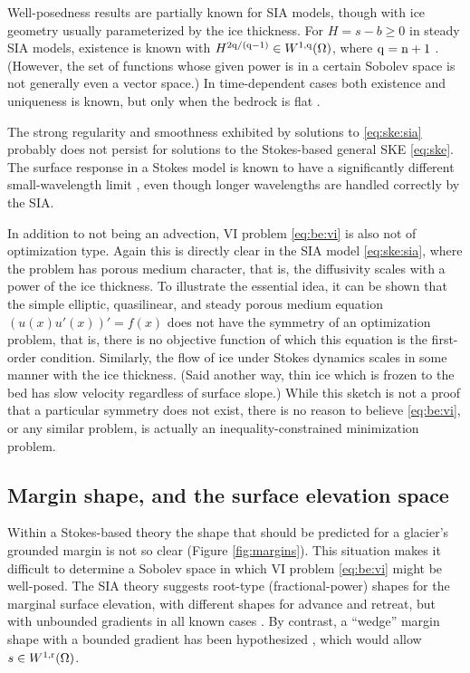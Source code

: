 \documentclass[hidelinks,onefignum,onetabnum,final]{siamart220329}  %
\newcommand{\nn}{{\text{\textnormal{n}}}}
\newcommand{\qq}{{\text{\textnormal{q}}}}
\newcommand{\rr}{{\text{\textnormal{r}}}}
\begin{document}
Well-posedness results are partially known for SIA models, though with ice geometry usually parameterized by the ice thickness.  For $H=s-b \ge 0$ in steady SIA models, existence is known with $H^{2\qq/(\qq-1)} \in W^{1,\qq}(\Omega)$, where $\qq=\nn+1$ \cite{JouvetBueler2012}.  (However, the set of functions whose given power is in a certain Sobolev space is not generally even a vector space.)  In time-dependent cases both existence and uniqueness is known, but only when the bedrock is flat \cite{Calvoetal2003,PiersantiTemam2023}.

The strong regularity and smoothness exhibited by solutions to \eqref{eq:ske:sia} probably does not persist for solutions to the Stokes-based general SKE \eqref{eq:ske}.  The surface response in a Stokes model is known to have a significantly different small-wavelength limit \cite{Pattynetal2008}, even though longer wavelengths are handled correctly by the SIA.

In addition to not being an advection, VI problem \eqref{eq:be:vi} is also not of optimization type.  Again this is directly clear in the SIA model \eqref{eq:ske:sia}, where the problem has porous medium character, that is, the diffusivity scales with a power of the ice thickness.  To illustrate the essential idea, it can be shown that the simple elliptic, quasilinear, and steady porous medium equation $(u(x) u'(x))' = f(x)$ does not have the symmetry of an optimization problem, that is, there is no objective function of which this equation is the first-order condition.  Similarly, the flow of ice under Stokes dynamics scales in some manner with the ice thickness.  (Said another way, thin ice which is frozen to the bed has slow velocity regardless of surface slope.)  While this sketch is not a proof that a particular symmetry does not exist, there is no reason to believe \eqref{eq:be:vi}, or any similar problem, is actually an inequality-constrained minimization problem.

\subsection{Margin shape, and the surface elevation space} \label{subsec:margin}  Within a Stokes-based theory the shape that should be predicted for a glacier's grounded margin is not so clear (Figure \ref{fig:margins}).  This situation makes it difficult to determine a Sobolev space in which VI problem \eqref{eq:be:vi} might be well-posed.  The SIA theory suggests root-type (fractional-power) shapes for the marginal surface elevation, with different shapes for advance and retreat, but with unbounded gradients in all known cases \cite{Bueleretal2005,JouvetBueler2012}.  By contrast, a ``wedge'' margin shape with a bounded gradient has been hypothesized \cite[for example]{EchelmeyerKamb1986}, which would allow $s\in W^{1,\rr}(\Omega)$.
\end{document}
